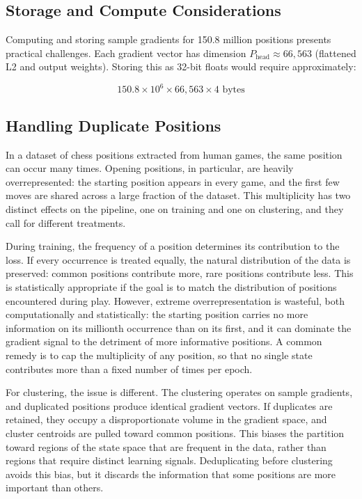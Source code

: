 \subsection{Storage and Compute Considerations}

Computing and storing sample gradients for 150.8 million positions presents practical challenges. Each gradient vector has dimension $P_{\text{head}} \approx 66{,}563$ (flattened L2 and output weights). Storing this as 32-bit floats would require approximately:

\[150.8 \times 10^6 \times 66{,}563 \times 4 \text{ bytes}\]


\subsection{Handling Duplicate Positions}

In a dataset of chess positions extracted from human games, the same position can occur many times. Opening positions, in particular, are heavily overrepresented: the starting position appears in every game, and the first few moves are shared across a large fraction of the dataset. This multiplicity has two distinct effects on the pipeline, one on training and one on clustering, and they call for different treatments.

During training, the frequency of a position determines its contribution to the loss. If every occurrence is treated equally, the natural distribution of the data is preserved: common positions contribute more, rare positions contribute less. This is statistically appropriate if the goal is to match the distribution of positions encountered during play. However, extreme overrepresentation is wasteful, both computationally and statistically: the starting position carries no more information on its millionth occurrence than on its first, and it can dominate the gradient signal to the detriment of more informative positions. A common remedy is to cap the multiplicity of any position, so that no single state contributes more than a fixed number of times per epoch.


For clustering, the issue is different. The clustering operates on sample gradients, and duplicated positions produce identical gradient vectors. If duplicates are retained, they occupy a disproportionate volume in the gradient space, and cluster centroids are pulled toward common positions. This biases the partition toward regions of the state space that are frequent in the data, rather than regions that require distinct learning signals. Deduplicating before clustering avoids this bias, but it discards the information that some positions are more important than others.


